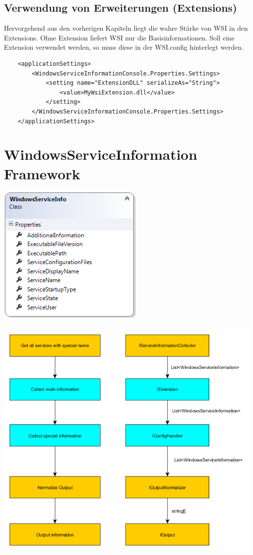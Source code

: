 \documentclass[11pt,DIV=15]{scrreprt}
\begin{document}
\section{Verwendung von Erweiterungen (Extensions)}
Hervorgehend aus den vorherigen Kapiteln liegt die wahre Stärke von WSI in den Extensions. Ohne Extension liefert WSI nur die Basisinformationen. Soll eine Extension verwendet werden, so muss diese in der WSI.config hinterlegt werden. 

\begin{lstlisting}
    <applicationSettings>
        <WindowsServiceInformationConsole.Properties.Settings>
            <setting name="ExtensionDLL" serializeAs="String">
                <value>MyWsiExtension.dll</value>
            </setting>
        </WindowsServiceInformationConsole.Properties.Settings>
    </applicationSettings>
\end{lstlisting}

\chapter{WindowsServiceInformation Framework}

\includegraphics{Class_WindowsServiceInformation.png}

\includegraphics[scale=0.65]{WSI_Concepts_generic.png}
\end{document}
